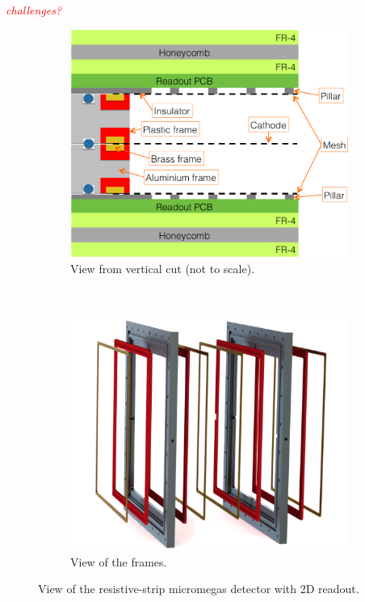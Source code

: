 \documentclass[a4paper,11pt]{article}
\begin{document}
\textcolor{red}{\emph{challenges?}}


\begin{figure}[h!]
        \centering
         \begin{subfigure}[b]{0.45\textwidth}
   	\includegraphics[keepaspectratio=true, width=\textwidth]{Figures/DoubletLayout.png}
	\caption{View from vertical cut (not to scale).}
	\label{cons-layout}
        \end{subfigure}
         ~
         \begin{subfigure}[b]{0.45\textwidth}
        \centering
   	\includegraphics[keepaspectratio=true, width=\textwidth]{Figures/DetFrames.png}
	\caption{View of the frames.}
                \label{cons-frames}
        \end{subfigure}
         \caption{View of the resistive-strip micromegas detector with 2D readout.}
        \label{cons}
\end{figure}
\end{document}
